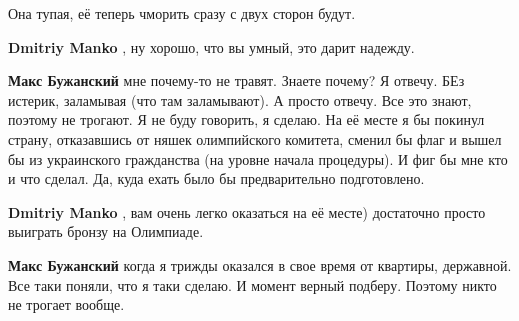 \begin{itemize}
 
Она тупая, её теперь чморить сразу с двух сторон будут.

\begin{itemize}
 
\textbf{Dmitriy Manko} , ну хорошо, что вы умный, это дарит надежду.

 
\textbf{Макс Бужанский} мне почему-то не травят. Знаете почему? Я отвечу. БЕз
истерик, заламывая (что там заламывают). А просто отвечу. Все это знают,
поэтому не трогают. Я не буду говорить, я сделаю. На её месте я бы покинул
страну, отказавшись от няшек олимпийского комитета, сменил бы флаг и вышел бы
из украинского гражданства (на уровне начала процедуры). И фиг бы мне кто и что
сделал. Да, куда ехать было бы предварительно подготовлено.

 
\textbf{Dmitriy Manko} , вам очень легко оказаться на её месте) достаточно просто выиграть бронзу на Олимпиаде.

 
\textbf{Макс Бужанский} когда я трижды оказался в свое время от квартиры,
державной. Все таки поняли, что я таки сделаю. И момент верный подберу. Поэтому
никто не трогает вообще.

 

\end{itemize}
\end{itemize}
